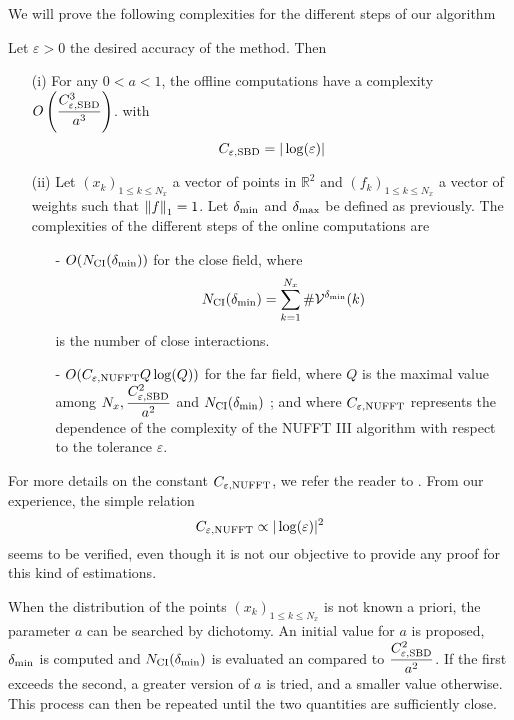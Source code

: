 \documentclass[11pt,a4paper]{article}
\begin{document}
We will prove the following complexities for the different steps of our algorithm
\begin{Prop} Let $\varepsilon > 0$ the desired accuracy of the method. Then 
\label{GlobalComplex}
\begin{itemize}
\item[(i)] For any $0 < a < 1$, the offline computations have a complexity $O\left(\dfrac{C_{\varepsilon,\textup{SBD}}^3}{a^3} \right)$. with 
\[C_{\varepsilon,\textup{SBD}} = |\log(\varepsilon)|\]

\item[(ii)] Let $(x_k)_{1 \leq k \leq N_x}$ a vector of points in $\mathbb{R}^2$ and $(f_k)_{1 \leq k \leq N_x}$ a vector of weights such that $\left\|f\right\|_1 = 1$. Let $\delta_{\min}$ and $\delta_{\max}$ be defined as previously. The complexities of the different steps of the online computations are
\begin{itemize}
\item[-] $O(N_{\textup{CI}}(\delta_{\min}))$ for the close field, where 
\[N_{\textup{CI}}(\delta_{\min}) = \sum_{k=1}^{N_x} \#\mathcal{V}^{\delta_{\min}}(k)\] 
is the number of close interactions. 
\item[-] $O(C_{\varepsilon,\textup{NUFFT}}Q \log(Q))$ for the far field, where $Q$ is the maximal value among $N_x, \dfrac{C_{\varepsilon,\textup{SBD}}^2}{a^2}$ and $N_{\textup{CI}}(\delta_{\min})$ ; and where $C_{\varepsilon,\textup{NUFFT}}$ represents the dependence of the complexity of the NUFFT III algorithm with respect to the tolerance $\varepsilon$. 
\end{itemize}
\end{itemize} 
\end{Prop}

\begin{Rem} For more details on the constant $C_{\varepsilon,\textup{NUFFT}}$, we refer the reader to \cite{NDFT}. From our experience, the simple relation
\[ C_{\varepsilon,\textup{NUFFT}} \propto |\log(\varepsilon)|^2\]
seems to be verified, even though it is not our objective to provide any proof for this kind of estimations. 
\end{Rem}

When the distribution of the points $(x_k)_{1 \leq k \leq N_x}$ is not known a priori, the parameter $a$ can be searched by dichotomy. An initial value for $a$ is proposed, $\delta_{\min}$ is computed and $N_{\textup{CI}}(\delta_{\min})$ is evaluated an compared to $\dfrac{C_{\varepsilon,\textup{SBD}}^2}{a^2}$. If the first exceeds the second, a greater version of $a$ is tried, and a smaller value otherwise. This process can then be repeated until the two quantities are sufficiently close.  
\end{document}

